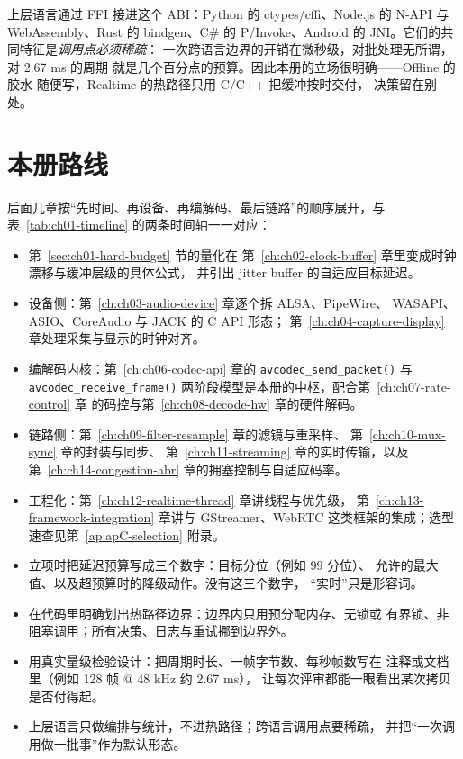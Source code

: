 \documentclass[12pt,a4paper,fontset=fandol]{ctexbook}
\newcommand{\Fn}[1]{\texttt{#1()}}
\newcommand{\Bk}{\discretionary{}{}{}}
\newcommand{\Lang}[1]{\textsf{#1}}
\newcommand{\CL}{\Lang{C}}
\newcommand{\CPP}{\Lang{C++}}
\newcommand{\PY}{\Lang{Python}}
\newcommand{\DomRT}{\Lang{Realtime}}
\newcommand{\DomBatch}{\Lang{Offline}}
\begin{document}
上层语言通过 FFI 接进这个 ABI：\PY{} 的 ctypes/cffi、\Lang{Node.js}{}
的 N-API 与 WebAssembly、\Lang{Rust}{} 的 bindgen、\Lang{C\#}{} 的
P/Invoke、Android 的 JNI。它们的共同特征是\emph{调用点必须稀疏}：
一次跨语言边界的开销在微秒级，对批处理无所谓，对 2.67 ms 的周期
就是几个百分点的预算。因此本册的立场很明确——\DomBatch{} 的胶水
随便写，\DomRT{} 的热路径只用 \CL/{\Bk}\CPP{} 把缓冲按时交付，
决策留在别处。

\section{本册路线}
\label{sec:ch01-roadmap}

后面几章按``先时间、再设备、再编解码、最后链路''的顺序展开，与
表~\ref{tab:ch01-timeline} 的两条时间轴一一对应：

\begin{itemize}
  \item 第~\ref{sec:ch01-hard-budget} 节的量化在
        第~\ref{ch:ch02-clock-buffer} 章里变成时钟漂移与缓冲层级的具体公式，
        并引出 jitter buffer 的自适应目标延迟。
  \item 设备侧：第~\ref{ch:ch03-audio-device} 章逐个拆 ALSA、PipeWire、
        WASAPI、ASIO、CoreAudio 与 JACK 的 C API 形态；
        第~\ref{ch:ch04-capture-display} 章处理采集与显示的时钟对齐。
  \item 编解码内核：第~\ref{ch:ch06-codec-api} 章的
        \Fn{avcodec\_send\_packet} 与 \Fn{avcodec\_receive\_frame}
        两阶段模型是本册的中枢，配合第~\ref{ch:ch07-rate-control} 章
        的码控与第~\ref{ch:ch08-decode-hw} 章的硬件解码。
  \item 链路侧：第~\ref{ch:ch09-filter-resample} 章的滤镜与重采样、
        第~\ref{ch:ch10-mux-sync} 章的封装与同步、
        第~\ref{ch:ch11-streaming} 章的实时传输，以及
        第~\ref{ch:ch14-congestion-abr} 章的拥塞控制与自适应码率。
  \item 工程化：第~\ref{ch:ch12-realtime-thread} 章讲线程与优先级，
        第~\ref{ch:ch13-framework-integration} 章讲与 GStreamer、WebRTC
        这类框架的集成；选型速查见第~\ref{ap:apC-selection} 附录。
\end{itemize}

\begin{bestpractice}[title={先写下验收标准，再碰第一行热路径代码}]
\begin{itemize}
  \item 立项时把延迟预算写成三个数字：目标分位（例如 99 分位）、
        允许的最大值、以及超预算时的降级动作。没有这三个数字，
        ``实时''只是形容词。
  \item 在代码里明确划出热路径边界：边界内只用预分配内存、无锁或
        有界锁、非阻塞调用；所有决策、日志与重试挪到边界外。
  \item 用真实量级检验设计：把周期时长、一帧字节数、每秒帧数写在
        注释或文档里（例如 128 帧 $@$ 48 kHz 约 2.67 ms），
        让每次评审都能一眼看出某次拷贝是否付得起。
  \item 上层语言只做编排与统计，不进热路径；跨语言调用点要稀疏，
        并把``一次调用做一批事''作为默认形态。
\end{itemize}
\end{bestpractice}
\end{document}
